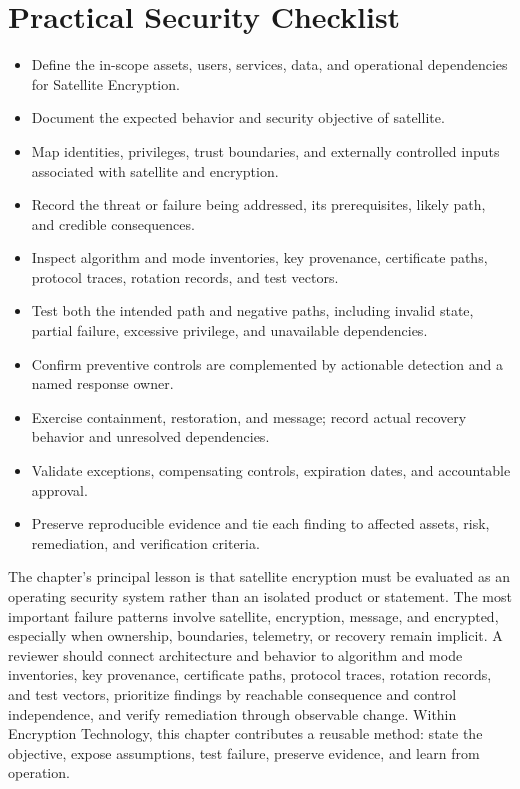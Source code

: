 \documentclass[11pt]{article}
\begin{document}
\section*{Practical Security Checklist}
\begin{itemize}[label=$\square$]
\item Define the in-scope assets, users, services, data, and operational dependencies for Satellite Encryption.
\item Document the expected behavior and security objective of satellite.
\item Map identities, privileges, trust boundaries, and externally controlled inputs associated with satellite and encryption.
\item Record the threat or failure being addressed, its prerequisites, likely path, and credible consequences.
\item Inspect algorithm and mode inventories, key provenance, certificate paths, protocol traces, rotation records, and test vectors.
\item Test both the intended path and negative paths, including invalid state, partial failure, excessive privilege, and unavailable dependencies.
\item Confirm preventive controls are complemented by actionable detection and a named response owner.
\item Exercise containment, restoration, and message; record actual recovery behavior and unresolved dependencies.
\item Validate exceptions, compensating controls, expiration dates, and accountable approval.
\item Preserve reproducible evidence and tie each finding to affected assets, risk, remediation, and verification criteria.
\end{itemize}
\begin{synthesisbox}
The chapter's principal lesson is that satellite encryption must be evaluated as an operating security system rather than an isolated product or statement. The most important failure patterns involve satellite, encryption, message, and encrypted, especially when ownership, boundaries, telemetry, or recovery remain implicit. A reviewer should connect architecture and behavior to algorithm and mode inventories, key provenance, certificate paths, protocol traces, rotation records, and test vectors, prioritize findings by reachable consequence and control independence, and verify remediation through observable change. Within Encryption Technology, this chapter contributes a reusable method: state the objective, expose assumptions, test failure, preserve evidence, and learn from operation.
\end{synthesisbox}
\end{document}
